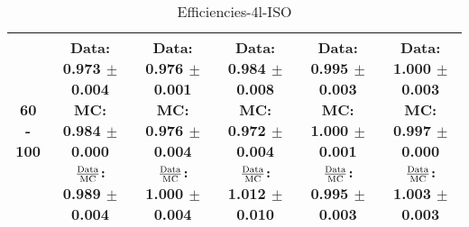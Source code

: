 \documentclass[final,letterpaper,twoside,12pt]{article}
\begin{document}
\begin{table}[htbp]
\begin{adjustwidth}{-4em}{-4em}
\begin{tabular}{|c|c|c|c|c|c|}
60 - 100 & \parbox[c]{1.1 in}{ \scriptsize  Data: 0.973 $\pm$ 0.004 \newline MC: 0.984 $\pm$ 0.000 \newline $\frac{\rm{Data}}{\rm{MC}}$: 0.989 $\pm$ 0.004} & \parbox[c]{1.1 in}{ \scriptsize  Data: 0.976 $\pm$ 0.001 \newline MC: 0.976 $\pm$ 0.004 \newline $\frac{\rm{Data}}{\rm{MC}}$: 1.000 $\pm$ 0.004} & \parbox[c]{1.1 in}{ \scriptsize  Data: 0.984 $\pm$ 0.008 \newline MC: 0.972 $\pm$ 0.004 \newline $\frac{\rm{Data}}{\rm{MC}}$: 1.012 $\pm$ 0.010} & \parbox[c]{1.1 in}{ \scriptsize  Data: 0.995 $\pm$ 0.003 \newline MC: 1.000 $\pm$ 0.001 \newline $\frac{\rm{Data}}{\rm{MC}}$: 0.995 $\pm$ 0.003} & \parbox[c]{1.1 in}{ \scriptsize  Data: 1.000 $\pm$ 0.003 \newline MC: 0.997 $\pm$ 0.000 \newline $\frac{\rm{Data}}{\rm{MC}}$: 1.003 $\pm$ 0.003}\\ \hline 
\end{tabular}
\caption {Efficiencies-4l-ISO}
\label{tab:cqdata0}
\end{adjustwidth}\end{table}
\end{document}
